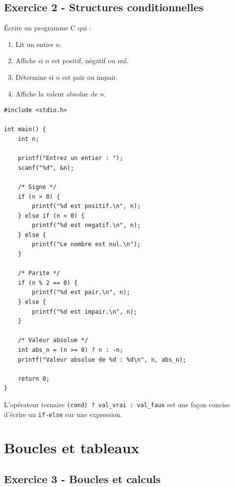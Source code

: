 \documentclass[12pt,a4paper]{article}
\begin{document}
\subsection*{Exercice 2 - Structures conditionnelles \niveau{\facile}}

\begin{boiteexercice}
Écrire un programme C qui :
\begin{enumerate}
  \item Lit un entier $n$.
  \item Affiche si $n$ est positif, négatif ou nul.
  \item Détermine si $n$ est pair ou impair.
  \item Affiche la valeur absolue de $n$.
\end{enumerate}
\end{boiteexercice}

\begin{boitecorrige}
\begin{lstlisting}
#include <stdio.h>

int main() {
    int n;

    printf("Entrez un entier : ");
    scanf("%d", &n);

    /* Signe */
    if (n > 0) {
        printf("%d est positif.\n", n);
    } else if (n < 0) {
        printf("%d est negatif.\n", n);
    } else {
        printf("Le nombre est nul.\n");
    }

    /* Parite */
    if (n % 2 == 0) {
        printf("%d est pair.\n", n);
    } else {
        printf("%d est impair.\n", n);
    }

    /* Valeur absolue */
    int abs_n = (n >= 0) ? n : -n;
    printf("Valeur absolue de %d : %d\n", n, abs_n);

    return 0;
}
\end{lstlisting}

L'opérateur ternaire \texttt{(cond) ? val\_vrai : val\_faux} est une façon concise d'écrire un \texttt{if-else} sur une expression.
\end{boitecorrige}

\section{Boucles et tableaux}

\subsection*{Exercice 3 - Boucles et calculs \niveau{\moyen}}
\end{document}
